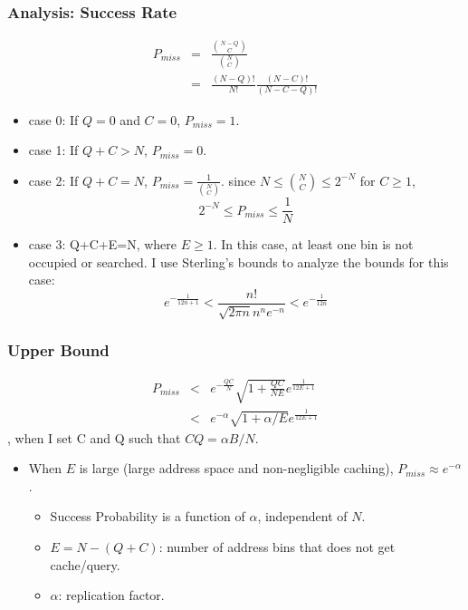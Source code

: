 \documentclass[red]{beamer}
\begin{document}
\begin{frame}
\frametitle{Analysis: Success Rate}
\begin{eqnarray}
P_{miss} &=& \frac{{{N-Q}\choose{C}}}{{{N}\choose{C}}}\\
         &=& \frac{(N-Q)!}{N!}\frac{(N-C)!}{(N-C-Q)!}
\end{eqnarray}
\end{frame}
\begin{frame}
\begin{itemize}
\item case 0: If $Q=0$ and $C=0$, $P_{miss}=1$.
\item case 1: If $Q+C>N$, $P_{miss}=0$.
\item case 2: If $Q+C=N$, $P_{miss}=\frac{1}{{{N}\choose{C}}}$. 
since $N \leq {{N}\choose{C}} \leq 2^{-N}$ for $C\geq 1$,  
\begin{equation}
2^{-N} \leq P_{miss} \leq \frac{1}{N}
\end{equation}
\item case 3: Q+C+E=N, where $E\geq1$. In this case, at least one bin is not 
occupied or searched.
I use Sterling's bounds to analyze the bounds for this case:
\begin{equation}
e^{-\frac{1}{12n+1}} < \frac{n!}{\sqrt{2\pi n}n^n e^{-n}} < e^{-\frac{1}{12n}}
\end{equation}
\end{itemize}
\end{frame}


\begin{frame}
\frametitle{Upper Bound}
\begin{eqnarray}
P_{miss} &<&e^{-\frac{QC}{N}} \sqrt{1+\frac{QC}{NE}} e^{\frac{1}{12E+1}}\\
         &<& e^{-\alpha}\sqrt{1+\alpha/E}e^{\frac{1}{12E+1}}
\end{eqnarray}
, when I set C and Q such that $CQ = \alpha B/N$.
\begin{itemize}
\item When $E$ is large (large address space and non-negligible caching),
$P_{miss} \approx e^{-\alpha}$.
\begin{itemize}
\item Success Probability is a function of $\alpha$, independent of $N$.
\item $E = N-(Q+C)$: number of address bins that does not get cache/query.
\item $\alpha$: replication factor.
\end{itemize}
\end{itemize}
\end{frame}
\end{document}

